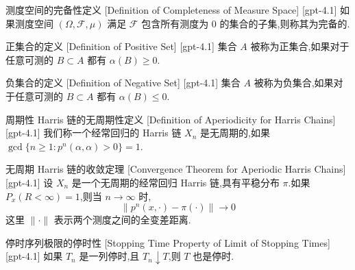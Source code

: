 \documentclass[UTF8]{ctexart}
\begin{document}
    \begin{dfn}
        {测度空间的完备性定义}
        [Definition of Completeness of Measure Space]
        [gpt-4.1]
        如果测度空间 $(\Omega, \mathcal{F}, \mu)$ 满足 $\mathcal{F}$ 包含所有测度为 0 的集合的子集,则称其为完备的.
    \end{dfn}
    
    
    
    \begin{dfn}
        {正集合的定义}
        [Definition of Positive Set]
        [gpt-4.1]
        集合 $A$ 被称为正集合,如果对于任意可测的 $B \subset A$ 都有 $\alpha(B) \geq 0$.
    \end{dfn}
    
    
    
    \begin{dfn}
        {负集合的定义}
        [Definition of Negative Set]
        [gpt-4.1]
        集合 $A$ 被称为负集合,如果对于任意可测的 $B \subset A$ 都有 $\alpha(B) \leq 0$.
    \end{dfn}
    
    
    
    \begin{dfn}
        {周期性 Harris 链的无周期性定义}
        [Definition of Aperiodicity for Harris Chains]
        [gpt-4.1]
        我们称一个经常回归的 Harris 链 $X_n$ 是无周期的,如果 $\operatorname{gcd}\{ n \geq 1 : p^n(\alpha, \alpha) > 0 \} = 1$.
    \end{dfn}
    
    
    
    \begin{thm}
        {无周期 Harris 链的收敛定理}
        [Convergence Theorem for Aperiodic Harris Chains]
        [gpt-4.1]
        设 $X_n$ 是一个无周期的经常回归 Harris 链,具有平稳分布 $\pi$.如果 $P_x(R < \infty) = 1$,则当 $n \to \infty$ 时,
\[
\| p^n(x, \cdot) - \pi(\cdot) \| \to 0
\]
这里 $\| \cdot \|$ 表示两个测度之间的全变差距离.
    \end{thm}
    
    
    
    \begin{thm}
        {停时序列极限的停时性}
        [Stopping Time Property of Limit of Stopping Times]
        [gpt-4.1]
        如果 $T_{n}$ 是一列停时,且 $T_{n} \downarrow T$,则 $T$ 也是停时.
    \end{thm}
    
\end{document}
